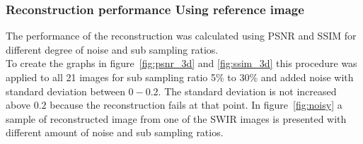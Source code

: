 \subsubsection{Reconstruction performance Using reference image}
\label{sec:reconstruction_performance}
The performance of the reconstruction was calculated using PSNR and SSIM for different degree of noise and sub sampling ratios.\\[0.1in]



To create the graphs in figure~\ref{fig:psnr_3d} and \ref{fig:ssim_3d} this procedure was applied to all 21 images for sub sampling ratio 5\% to 30\% and added noise with standard deviation between $0 - 0.2$. The standard deviation is not increased above $0.2$ because the reconstruction fails at that point. In figure~\ref{fig:noisy} a sample of reconstructed image from one of the SWIR images is presented with different amount of noise and sub sampling ratios.


